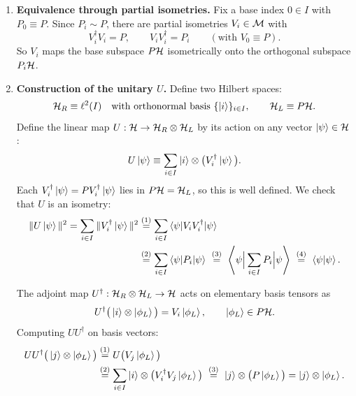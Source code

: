 \begin{itemize}
\begin{keyresult}
\begin{enumerate}[leftmargin=*]
\item \textbf{Equivalence through partial isometries.}
Fix a base index $0 \in I$ with $P_0 \equiv P$. Since $P_i \sim P$, there are partial isometries $V_i \in \mathcal{M}$
with
\[
V_i^\dagger V_i = P, \qquad V_i V_i^\dagger = P_i \qquad (\text{with } V_0 \equiv P).
\]
So $V_i$ maps the base subspace $P\mathcal{H}$ isometrically onto the orthogonal subspace $P_i\mathcal{H}$.

\item \textbf{Construction of the unitary $U$.}
Define two Hilbert spaces:
\[
\mathcal{H}_R \equiv \ell^2(I) \quad \text{with orthonormal basis } \{\ket{i}\}_{i \in I}, \qquad \mathcal{H}_L \equiv P\mathcal{H} .
\]
Define the linear map $U: \mathcal{H} \to \mathcal{H}_R \otimes \mathcal{H}_L$ by its action on any vector $\ket\psi \in \mathcal{H}$:
\[
U \ket\psi \equiv \sum_{i \in I} \ket{i} \otimes \big(V_i^\dagger \ket\psi\big) .
\]
Each $V_i^\dagger \ket\psi = P V_i^\dagger \ket\psi$ lies in $P\mathcal{H} = \mathcal{H}_L$, so this is well defined. We check
that $U$ is an isometry:
\begin{align}
\|U\ket\psi\|^2 = \sum_{i \in I} \|V_i^\dagger \ket\psi\|^2
&\overset{(1)}{=} \sum_{i \in I} \braket{\psi | V_i V_i^\dagger | \psi} \notag\\
&\overset{(2)}{=} \sum_{i \in I} \braket{\psi | P_i | \psi}
\ \overset{(3)}{=}\ \Braket{\psi \Big| \sum_{i \in I} P_i \Big| \psi}
\ \overset{(4)}{=}\ \braket{\psi|\psi} . \notag
\end{align}
\quad
{}\quad
{}\quad
{}

The adjoint map $U^\dagger: \mathcal{H}_R \otimes \mathcal{H}_L \to \mathcal{H}$ acts on elementary basis tensors as
\[
U^\dagger \big(\ket{i} \otimes \ket{\phi_L}\big) = V_i \ket{\phi_L}, \qquad \ket{\phi_L} \in P\mathcal{H} .
\]
Computing $U U^\dagger$ on basis vectors:
\begin{align}
U U^\dagger \big(\ket{j} \otimes \ket{\phi_L}\big)
&\overset{(1)}{=} U \big(V_j \ket{\phi_L}\big) \notag\\
&\overset{(2)}{=} \sum_{i \in I} \ket{i} \otimes \big(V_i^\dagger V_j \ket{\phi_L}\big)
\ \overset{(3)}{=}\ \ket{j} \otimes \big(P \ket{\phi_L}\big) = \ket{j} \otimes \ket{\phi_L} . \notag
\end{align}
\quad
{}\quad
{}


\end{enumerate}
\end{keyresult}
\end{itemize}
